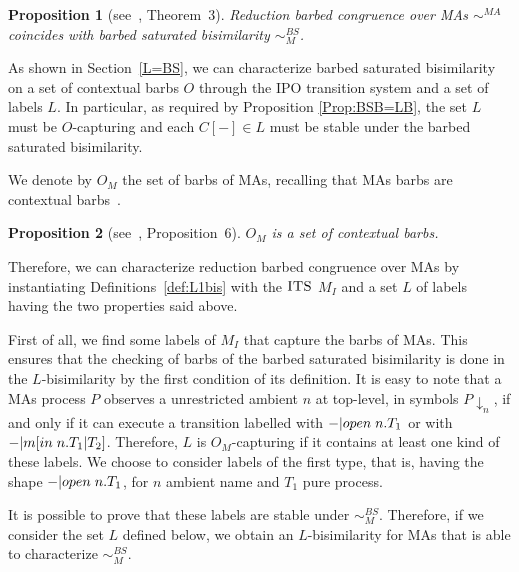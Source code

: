 \documentclass[copyright,creativecommons]{eptcs}
\newcommand{\barb}[1]{\downarrow_{#1}}
\newcommand{\bsbis}{\sim^{BS}}
\newcommand{\ilts}{\textsc{ITS}}
\newcommand{\<}{\langle}
\renewcommand{\>}{\rangle}
\newtheorem{proposition}{Proposition}{}
\begin{document}
\begin{proposition}[see~\cite{BGMFOSSACS09}, Theorem~3] 
\label{RBC=BSB}
  Reduction barbed congruence over MAs $\sim^{MA}$ coincides with
  barbed saturated bisimilarity $\bsbis_{\scriptscriptstyle{M}}$.
\end{proposition}

As shown in Section~\ref{L=BS}, we can characterize barbed saturated bisimilarity
on a set of contextual barbs $O$ through the IPO transition system and a set of labels $L$.
In particular, as required by Proposition \ref{Prop:BSB=LB}, the set $L$
must be $O$-capturing and each $C[-] \in L$ must be stable under the barbed saturated bisimilarity.

We denote by $O_{\scriptscriptstyle{M}}$ the set of barbs of MAs,
recalling that MAs barbs are contextual barbs~\cite{BGMFOSSACS09}.

\begin{proposition}[see~\cite{BGMFOSSACS09}, Proposition~6] 
  \label{MAsCB}
$O_{\scriptscriptstyle{M}}$ is a set of contextual barbs.
\end{proposition}

Therefore, we can characterize reduction barbed congruence over MAs by instantiating
Definitions~\ref{def:L1bis} with the $\ilts$ $M_I$ and a set $L$ of labels having the two properties
said above.

First of all, we find some labels of $M_I$ that capture the barbs of MAs.
This ensures that the checking of barbs of the barbed saturated bisimilarity is
done in the $L$-bisimilarity by the first condition of its definition.
It is easy to note that a MAs process $P$ observes a unrestricted ambient $n$ at top-level,
in symbols $P \barb n$, if and only if it can execute a transition labelled with
$-|open \hspace{1 mm} n.T_1$ or with $-|m[in \hspace{1mm} n.T_1|T_2]$.
Therefore, $L$ is $O_{\scriptscriptstyle{M}}$-capturing if it contains at least one kind of these labels.
We choose to consider labels of the first type, that is, having
the shape  $-|open \hspace{1mm} n.T_1$, for $n$ ambient name and $T_1$ pure process.

It is possible to prove that these labels are stable under
$\bsbis_{\scriptscriptstyle{M}}$. Therefore,
if we consider the set $L$ defined below, we obtain an $L$-bisimilarity for MAs
that is able to characterize $\bsbis_{\scriptscriptstyle{M}}$.
\end{document}
